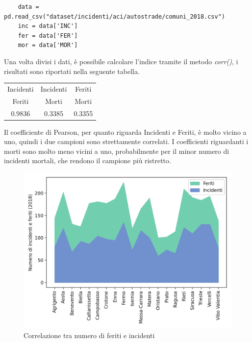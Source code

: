 \documentclass[a4paper]{report}
\begin{document}
\begin{lstlisting}
    data = pd.read_csv("dataset/incidenti/aci/autostrade/comuni_2018.csv")
    inc = data['INC']
    fer = data['FER']
    mor = data['MOR']
\end{lstlisting}

Una volta divisi i dati, è possibile calcolare l'indice tramite il metodo \textit{corr()}, 
i risultati sono riportati nella seguente tabella.

\begin{center}
    \def\arraystretch{1.5}%
    \begin{tabular}{ |c|c|c| } 
    \hline
    Incidenti & Incidenti & Feriti \\ 
    Feriti & Morti & Morti \\ 
    \hline
    0.9836 & 0.3385 & 0.3355 \\ 
    \hline
    \end{tabular}
\end{center}

Il coefficiente di Pearson, per quanto riguarda Incidenti e Feriti, 
è molto vicino a uno, quindi i due campioni sono strettamente correlati.
I coefficienti riguardanti i morti sono molto meno vicini a uno, probabilmente per il 
minor numero di incidenti mortali, che rendono il campione più ristretto.

\begin{figure}
    \includegraphics[width=\linewidth]{../src/incidenti/incidenti_aci/provincia/corr_incidenti.png}
    \caption{Correlazione tra numero di feriti e incidenti}
    \label{fig:corr-incidenti-feriti}
\end{figure}
\end{document}
